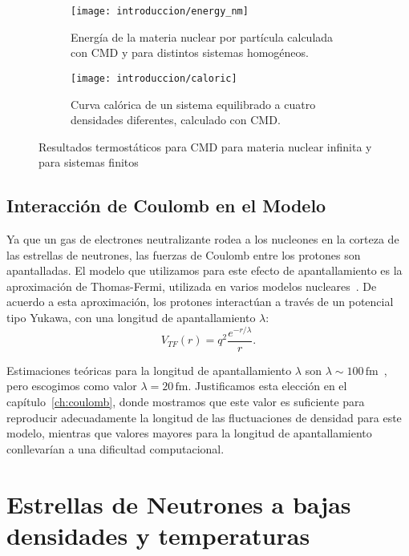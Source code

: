 \begin{figure}[h]
  \centering
  \begin{subfigure}[h!]{0.48\columnwidth}
    \texttt{[image: introduccion/energy\_nm]}
  \caption{Energía de la materia nuclear por partícula calculada con CMD y para distintos sistemas homogéneos.}
  \label{fig:energy_nm}
  \end{subfigure}
  \begin{subfigure}[h!]{0.48\columnwidth}
  \texttt{[image: introduccion/caloric]}
  \caption{Curva calórica de un sistema equilibrado a cuatro densidades diferentes, calculado con CMD.}
  \label{fig:caloric}
  \end{subfigure}
  \caption{Resultados termostáticos para CMD para materia nuclear infinita y para sistemas finitos}
\end{figure}


\subsection{Interacción de Coulomb en el Modelo}\label{sc:coulomb}

Ya que un gas de electrones neutralizante rodea a los nucleones en la corteza de las estrellas de neutrones, las fuerzas de Coulomb entre los protones son apantalladas.
El modelo que utilizamos para este efecto de apantallamiento es la aproximación de Thomas-Fermi, utilizada en varios modelos nucleares~\cite{maruyama_quantum_1998, dorso_topological_2012, horowitz_neutrino-pasta_2004}.
De acuerdo a esta aproximación, los protones interactúan a través de un potencial tipo Yukawa, con una longitud de apantallamiento $\lambda$:
\begin{equation*}
 V_{TF}(r) = q^2\frac{e^{-r/\lambda}}{r}.
\end{equation*}

Estimaciones teóricas para la longitud de apantallamiento $\lambda$ son $\lambda\sim100\,\text{fm}$~\cite{fetter_quantum_2003}, pero escogimos como valor $\lambda=20\,\text{fm}$.
Justificamos esta elección en el capítulo~\ref{ch:coulomb}, donde mostramos que este valor es suficiente para reproducir adecuadamente la longitud de las fluctuaciones de densidad para este modelo, mientras que valores mayores para la longitud de apantallamiento conllevarían a una dificultad computacional.

\section{Estrellas de Neutrones a bajas densidades y temperaturas}\label{sc:nsm_lowd}

